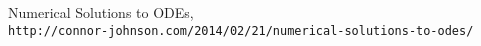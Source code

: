 \documentclass[a4paper,10pt]{article}
\begin{document}
\medskip

\begin{thebibliography}{9}
 Numerical Solutions to ODEs, \\\texttt{http://connor-johnson.com/2014/02/21/numerical-solutions-to-odes/}
\end{thebibliography}
\end{document}
